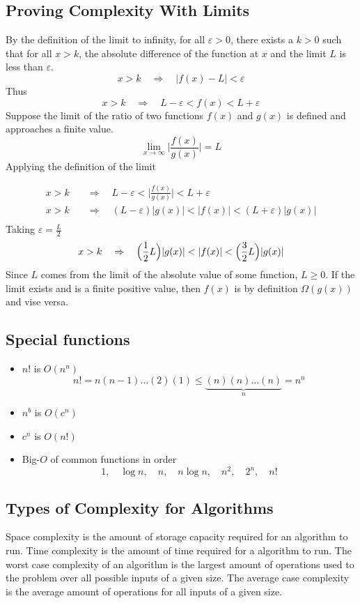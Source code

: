 \documentclass{article}
\theoremstyle{mytheoremstyle}
\theoremstyle{mytheoremstyle}
\theoremstyle{myproblemstyle}
\begin{document}
    \subsection*{Proving Complexity With Limits}
    By the definition of the limit to infinity, for all $\varepsilon>0$, there
    exists a $k>0$ such that for all $x>k$, the absolute difference of the
    function at $x$ and the limit $L$ is less than $\varepsilon$.
    \[
         x>k \quad\Rightarrow\quad |f(x)-L|<\varepsilon
    \]
    Thus
    \[
        x>k \quad\Rightarrow\quad L-\varepsilon<f(x)<L+\varepsilon
    \]
    Suppose the limit of the ratio of two functions $f(x)$ and $g(x)$ is defined
    and approaches a finite value.
    \[
        \lim_{x\to \infty} \Big|\frac{f(x)}{g(x)}\Big| = L
    \]
    Applying the definition of the limit

    \begin{align*}
        x>k \quad&\Rightarrow\quad L-\varepsilon< \Big|\frac{f(x)}{g(x)}\Big| <L+\varepsilon \\
        x>k \quad&\Rightarrow\quad (L-\varepsilon)|g(x)| < |f(x)| < (L+\varepsilon)|g(x)| \\
    \end{align*}
    Taking $\varepsilon= \frac{L}{2}$
    \[
        x>k \quad\Rightarrow\quad \Big(\frac{1}{2} L\Big)|g(x)| < |f(x)| < \Big(\frac{3}{2} L\Big)|g(x)| \\
    \]
    Since $L$ comes from the limit of the absolute value of some function,
    $L\ge0$. If the limit exists and is a finite positive value, then $f(x)$ is
    by definition $\Omega(g(x))$ and vise versa.


    \subsection*{Special functions}
    \begin{itemize}
        \item $n!$ is $O(n^n)$
            \[
                n! = n (n-1) \dots (2)(1) \le
                \underbrace{(n)(n)\dots(n)}_n = n^n
            \]
        \item $n^b$ is $O(c^n)$
        \item $c^n$ is $O(n!)$
        \item Big-$O$ of common functions in order
            \[
                1,\quad \log n,\quad n,\quad n\log n,\quad n^2,\quad 2^n,\quad n!
            \]
    \end{itemize}

    \subsection*{Types of Complexity for Algorithms}
    Space complexity is the amount of storage capacity required for an algorithm
    to run. Time complexity is the amount of time required for a algorithm to
    run. The worst case complexity of an algorithm is the largest amount of
    operations used to the problem over all possible inputs of a given size. The
    average case complexity is the average amount of operations for all inputs
    of a given size.
\end{document}
